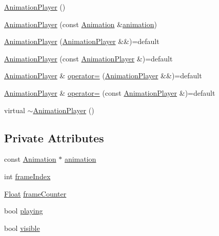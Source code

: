 \begin{DoxyCompactItemize}
\item 
\hyperlink{classZeta_1_1AnimationPlayer_acf5fb0662e00a33f07c417a03e3a9349}{Animation\+Player} ()
\item 
\hyperlink{classZeta_1_1AnimationPlayer_a6984991c2012ea4e58d56a37ac03ffbd}{Animation\+Player} (const \hyperlink{classZeta_1_1Animation}{Animation} \&\hyperlink{classZeta_1_1AnimationPlayer_a4b97c373a921a0ea6a67c5371f346ddf}{animation})
\item 
\hyperlink{classZeta_1_1AnimationPlayer_a05788d29d1c53962a54baf1aef04bb0f}{Animation\+Player} (\hyperlink{classZeta_1_1AnimationPlayer}{Animation\+Player} \&\&)=default
\item 
\hyperlink{classZeta_1_1AnimationPlayer_a6a4fe4e31848481c2bf9e9c65e64451f}{Animation\+Player} (const \hyperlink{classZeta_1_1AnimationPlayer}{Animation\+Player} \&)=default
\item 
\hyperlink{classZeta_1_1AnimationPlayer}{Animation\+Player} \& \hyperlink{classZeta_1_1AnimationPlayer_a99b51751fa45e06d1b60a88578bf6771}{operator=} (\hyperlink{classZeta_1_1AnimationPlayer}{Animation\+Player} \&\&)=default
\item 
\hyperlink{classZeta_1_1AnimationPlayer}{Animation\+Player} \& \hyperlink{classZeta_1_1AnimationPlayer_a7f8e9d9bcd00cd22fddab46505e12745}{operator=} (const \hyperlink{classZeta_1_1AnimationPlayer}{Animation\+Player} \&)=default
\item 
virtual \hyperlink{classZeta_1_1AnimationPlayer_a0482bd50671616b8af87a8b096131b70}{$\sim$\+Animation\+Player} ()
\end{DoxyCompactItemize}
\subsection*{Private Attributes}
\begin{DoxyCompactItemize}
\item 
const \hyperlink{classZeta_1_1Animation}{Animation} $\ast$ \hyperlink{classZeta_1_1AnimationPlayer_a4b97c373a921a0ea6a67c5371f346ddf}{animation}
\item 
int \hyperlink{classZeta_1_1AnimationPlayer_a18cdb164a09c132e5d94d20e65d0ee97}{frame\+Index}
\item 
\hyperlink{namespaceZeta_a1e0a1265f9b3bd3075fb0fabd39088ba}{Float} \hyperlink{classZeta_1_1AnimationPlayer_a9976b8e6d0bb822f289fa5caaf1de8c9}{frame\+Counter}
\item 
bool \hyperlink{classZeta_1_1AnimationPlayer_a0f2b6832532d76d52acff90e31b27f15}{playing}
\item 
bool \hyperlink{classZeta_1_1AnimationPlayer_a38f2ef2f0e15300c862b860ab3eb8534}{visible}
\end{DoxyCompactItemize}


